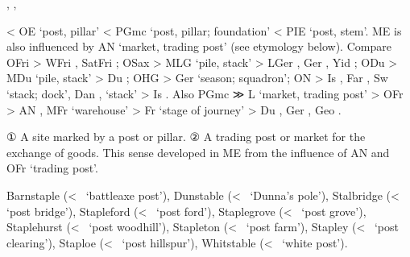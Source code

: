 \documentclass[12pt,letterpaper,oneside,article,draft]{memoir}
\begin{document}
\begin{Lemma}
\begin{Also}
	, , 
\end{Also}
\begin{Etymology}
	< OE  ‘post, pillar’ < PGmc  ‘post, pillar; foundation’
		< PIE  ‘post, stem’.
	ME  is also influenced by AN  ‘market, trading post’ (see etymology below).
	Compare
	OFri  > WFri , SatFri ;
	OSax  > MLG  ‘pile, stack’ > LGer , Ger ,
		Yid  ;
	ODu  > MDu  ‘pile, stack’ > Du ;
	OHG  > Ger  ‘season; squadron’;
	ON  > Is , Far , Sw  ‘stack; dock’,
		Dan ,  ‘stack’ > Is .
	Also
	PGmc  ≫ L  ‘market, trading post’
		> OFr  > AN , MFr  ‘warehouse’
		> Fr  ‘stage of journey’
		> Du , Ger , Geo  .
\end{Etymology}
\begin{Definitions}
	① A site marked by a post or pillar.
	② A trading post or market for the exchange of goods. This sense developed in ME from the influence
		of AN and OFr  ‘trading post’.
\end{Definitions}
\begin{Examples}
	Barnstaple (<~ ‘battleaxe post’), Dunstable (<~ ‘Dunna’s pole’), Stalbridge (<~ ‘post bridge’), Stapleford (<~ ‘post ford’), Staplegrove (<~ ‘post grove’), Staplehurst (<~ ‘post woodhill’), Stapleton (<~ ‘post farm’), Stapley (<~ ‘post clearing’), Staploe (<~ ‘post hillspur’), Whitstable (<~ ‘white post’).
\end{Examples}
\end{Lemma}

\begin{Lemma}
\end{Lemma}

\begin{Lemma}
\end{Lemma}

\begin{Lemma}
\begin{Also}
\end{Also}
\end{Lemma}
\end{document}

